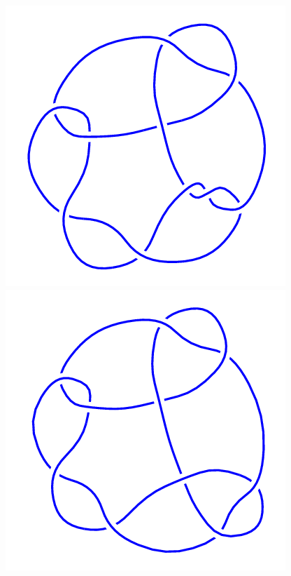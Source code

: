 \begin{figure}[H]
	\begin{minipage}[b]{.18\linewidth}
		\centering
		\includegraphics[width=\linewidth]{../data/10_77.png}
	\end{minipage}
	\begin{minipage}[b]{.18\linewidth}
		\centering
		\includegraphics[width=\linewidth]{../data/10_78.png}

\end{minipage}
\end{figure}
